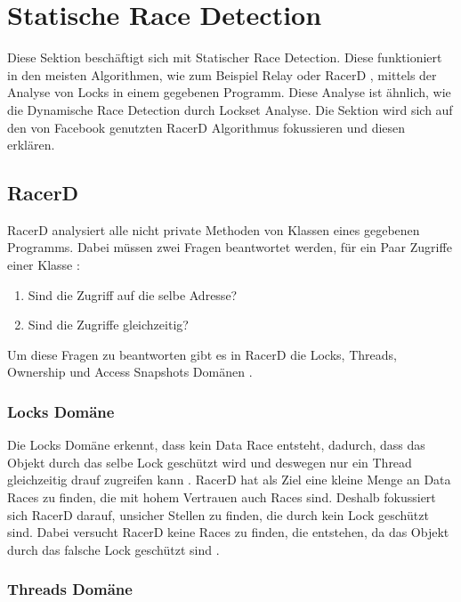 \section{Statische Race Detection}

Diese Sektion beschäftigt sich mit Statischer Race Detection. Diese funktioniert in den meisten Algorithmen, wie zum Beispiel Relay \cite[vgl.][208]{relay} oder RacerD \cite[vgl.][57]{nikos_2019}, mittels der Analyse von Locks in einem gegebenen Programm. Diese Analyse ist ähnlich, wie die Dynamische Race Detection durch Lockset Analyse. Die Sektion wird sich auf den von Facebook genutzten RacerD Algorithmus \cite[vgl.][2]{racerd} fokussieren und diesen erklären. 

\subsection*{RacerD}

RacerD analysiert alle nicht private Methoden von Klassen eines gegebenen Programms. Dabei müssen zwei Fragen beantwortet werden, für ein Paar Zugriffe einer Klasse \cite[vgl.][7]{racerd}:

\begin{enumerate}
	\item Sind die Zugriff auf die selbe Adresse?
	\item Sind die Zugriffe gleichzeitig?
\end{enumerate}

Um diese Fragen zu beantworten gibt es in RacerD die Locks, Threads, Ownership und Access Snapshots Domänen \cite[vgl.][7-8]{racerd}. 

\subsubsection*{Locks Domäne}

Die Locks Domäne erkennt, dass kein Data Race entsteht, dadurch, dass das Objekt durch das selbe Lock geschützt wird und deswegen nur ein Thread gleichzeitig drauf zugreifen kann \cite[vgl.][8]{racerd}. RacerD hat als Ziel eine kleine Menge an Data Races zu finden, die mit hohem Vertrauen auch Races sind. Deshalb fokussiert sich RacerD darauf, unsicher Stellen zu finden, die durch kein Lock geschützt sind. Dabei versucht RacerD keine Races zu finden, die entstehen, da das Objekt durch das falsche Lock geschützt sind \cite[vgl.][9]{racerd}. 

\subsubsection*{Threads Domäne}

